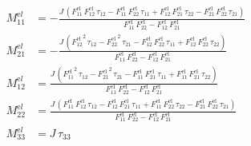 \begin{align}
M^{\mathrm el}_{11} &= -\frac{J\,\left(F_{11}^{\mathrm{el}}\,F_{12}^{\mathrm{el}}\,\tau _{12}-F_{11}^{\mathrm{el}}\,F_{22}^{\mathrm{el}}\,\tau _{11}+F_{12}^{\mathrm{el}}\,F_{21}^{\mathrm{el}}\,\tau _{22}-F_{21}^{\mathrm{el}}\,F_{22}^{\mathrm{el}}\,\tau _{21}\right)}{F_{11}^{\mathrm{el}}\,F_{22}^{\mathrm{el}}-F_{12}^{\mathrm{el}}\,F_{21}^{\mathrm{el}}} \\ 
M^{\mathrm el}_{21} &= -\frac{J\,\left({F_{12}^{\mathrm{el}}}^2\,\tau _{12}-{F_{22}^{\mathrm{el}}}^2\,\tau _{21}-F_{12}^{\mathrm{el}}\,F_{22}^{\mathrm{el}}\,\tau _{11}+F_{12}^{\mathrm{el}}\,F_{22}^{\mathrm{el}}\,\tau _{22}\right)}{F_{11}^{\mathrm{el}}\,F_{22}^{\mathrm{el}}-F_{12}^{\mathrm{el}}\,F_{21}^{\mathrm{el}}} \\ 
M^{\mathrm el}_{12} &= \frac{J\,\left({F_{11}^{\mathrm{el}}}^2\,\tau _{12}-{F_{21}^{\mathrm{el}}}^2\,\tau _{21}-F_{11}^{\mathrm{el}}\,F_{21}^{\mathrm{el}}\,\tau _{11}+F_{11}^{\mathrm{el}}\,F_{21}^{\mathrm{el}}\,\tau _{22}\right)}{F_{11}^{\mathrm{el}}\,F_{22}^{\mathrm{el}}-F_{12}^{\mathrm{el}}\,F_{21}^{\mathrm{el}}} \\ 
M^{\mathrm el}_{22} &= \frac{J\,\left(F_{11}^{\mathrm{el}}\,F_{12}^{\mathrm{el}}\,\tau _{12}-F_{12}^{\mathrm{el}}\,F_{21}^{\mathrm{el}}\,\tau _{11}+F_{11}^{\mathrm{el}}\,F_{22}^{\mathrm{el}}\,\tau _{22}-F_{21}^{\mathrm{el}}\,F_{22}^{\mathrm{el}}\,\tau _{21}\right)}{F_{11}^{\mathrm{el}}\,F_{22}^{\mathrm{el}}-F_{12}^{\mathrm{el}}\,F_{21}^{\mathrm{el}}} \\ 
M^{\mathrm el}_{33} &= J\,\tau _{33} 
\end{align}
